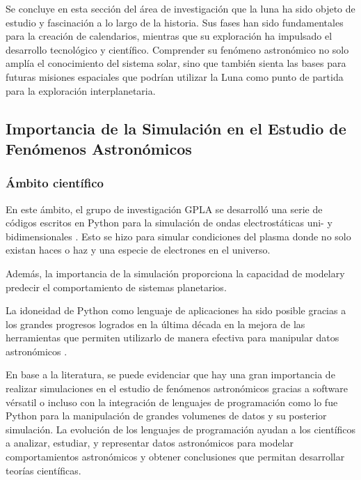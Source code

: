 Se concluye en esta sección del área de investigación que la luna ha sido objeto de estudio y fascinación a lo largo de la historia. Sus fases han sido fundamentales para la creación de calendarios, mientras que su exploración ha impulsado el desarrollo tecnológico y científico. Comprender su fenómeno astronómico no solo amplía el conocimiento del sistema solar, sino que también sienta las bases para futuras misiones espaciales que podrían utilizar la Luna como punto de partida para la exploración interplanetaria.


\subsection*{Importancia de la Simulación en el Estudio de Fenómenos Astronómicos}

\subsubsection*{Ámbito científico}


En este ámbito, el grupo de investigación GPLA se desarrolló una serie de códigos escritos en
Python para la simulación de ondas electrostáticas uni- y bidimensionales \cite{ondas}. Esto se hizo para simular condiciones del plasma donde
no solo existan haces o haz y una especie de electrones en el universo.

Además, la importancia de la simulación proporciona la capacidad de modelary predecir el comportamiento de sistemas planetarios\cite{perryman}.

La idoneidad de Python como lenguaje de aplicaciones ha sido posible gracias a los grandes
progresos logrados en la última década en la mejora de las herramientas que permiten utilizarlo
de manera efectiva para manipular datos astronómicos \cite{green}.

En base a la literatura, se puede evidenciar que hay una gran importancia de realizar simulaciones en el estudio de fenómenos astronómicos
gracias a software vérsatil o incluso con la integración de lenguajes de programación como lo fue Python para la manipulación de grandes volumenes
de datos y su posterior simulación. La evolución de los lenguajes de programación ayudan a los científicos a analizar, estudiar, y representar datos astronómicos 
para modelar comportamientos astronómicos y obtener conclusiones que permitan desarrollar teorías científicas.



